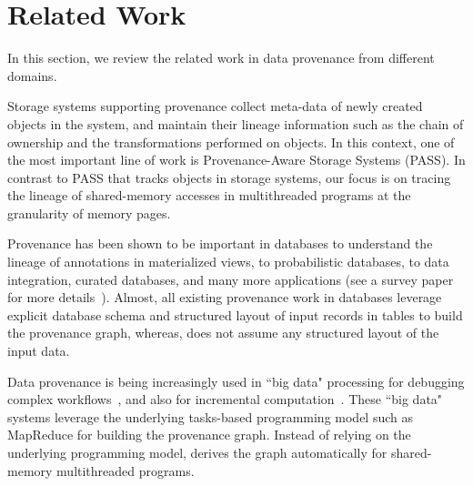 \section{Related Work}
\label{sec:related}





In this section, we review the related work in data provenance from different domains.





 Storage systems supporting provenance collect meta-data of newly created objects in the system, %
and  maintain their lineage information such as the chain of ownership and the transformations performed on objects. In this context, one of the most important line of work is Provenance-Aware Storage Systems (PASS).  
In contrast to PASS that tracks objects in storage systems, our focus is on tracing the lineage of shared-memory accesses in multithreaded programs at the granularity of memory pages. %


 Provenance has been shown to be important in databases to understand the lineage of annotations in materialized views,  to probabilistic databases, to data integration, curated databases, and many more applications (see a survey paper for more details~\cite{provenance-database-tutorial}). Almost, all existing provenance work in databases leverage explicit database schema and structured layout of input records in tables to build the provenance graph, whereas, \projecttitle does not assume any structured layout of the input data.

 
 Data provenance is being increasingly used in ``big data"  processing for  debugging complex workflows~\cite{nova}, and also for incremental computation~\cite{incoop}.  These ``big data" systems leverage the underlying tasks-based programming model such as MapReduce for building the provenance graph. 
Instead of relying on the underlying programming model,  \projecttitle derives the graph automatically for shared-memory multithreaded programs.



